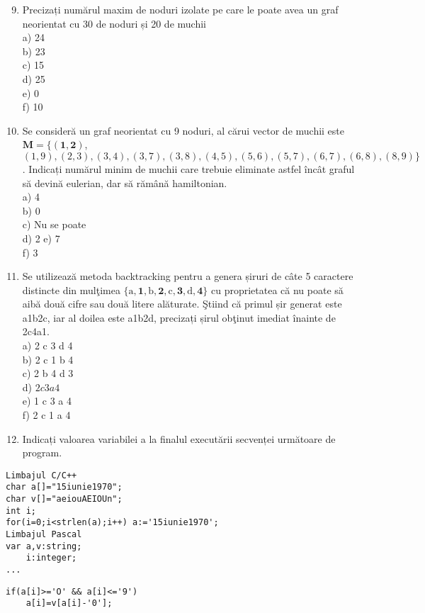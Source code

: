 \begin{enumerate}
  \setcounter{enumi}{8}
  \item Precizați numărul maxim de noduri izolate pe care le poate avea un graf neorientat cu 30 de noduri și 20 de muchii\\
a) 24\\
b) 23\\
c) 15\\
d) 25\\
e) 0\\
f) 10
  \item Se consideră un graf neorientat cu 9 noduri, al cărui vector de muchii este $\mathbf{M}=\{(\mathbf{1}, \mathbf{2})$, $(1,9),(2,3),(3,4),(3,7),(3,8),(4,5),(5,6),(5,7),(6,7),(6,8),(8,9)\}$. Indicați numărul minim de muchii care trebuie eliminate astfel încât graful să devină eulerian, dar să rămână hamiltonian.\\
a) 4\\
b) 0\\
c) Nu se poate\\
d) 2 e) 7\\
f) 3
  \item Se utilizează metoda backtracking pentru a genera șiruri de câte 5 caractere distincte din mulţimea $\{\mathrm{a}, \mathbf{1}, \mathrm{b}, \mathbf{2}, \mathrm{c}, \mathbf{3}, \mathrm{d}, \mathbf{4}\}$ cu proprietatea că nu poate să aibă două cifre sau două litere alăturate. Ştiind că primul șir generat este a1b2c, iar al doilea este a1b2d, precizați șirul obţinut imediat înainte de 2c4a1.\\
a) 2 c 3 d 4\\
b) 2 c 1 b 4\\
c) 2 b 4 d 3\\
d) $2 c 3 a 4$\\
e) 1 c 3 a 4\\
f) 2 c 1 a 4
  \item Indicați valoarea variabilei a la finalul executării secvenței următoare de program.
\end{enumerate}

\begin{verbatim}
Limbajul C/C++
char a[]="15iunie1970";
char v[]="aeiouAEIOUn";
int i;
for(i=0;i<strlen(a);i++) a:='15iunie1970';
Limbajul Pascal
var a,v:string;
    i:integer;
...
\end{verbatim}

\begin{verbatim}
if(a[i]>='O' && a[i]<='9')
    a[i]=v[a[i]-'0'];
\end{verbatim}

